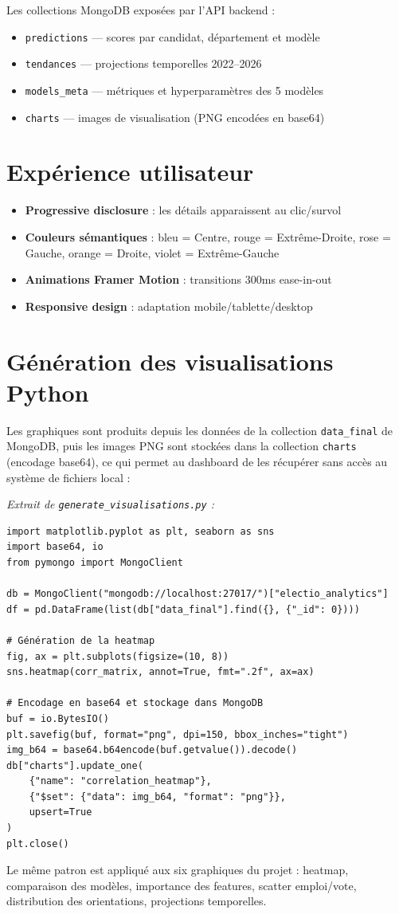 \medskip\noindent
Les collections MongoDB exposées par l'API backend :
\begin{itemize}
  \item \texttt{predictions} --- scores par candidat, département et modèle
  \item \texttt{tendances} --- projections temporelles 2022--2026
  \item \texttt{models\_meta} --- métriques et hyperparamètres des 5 modèles
  \item \texttt{charts} --- images de visualisation (PNG encodées en base64)
\end{itemize}

\section{Expérience utilisateur}

\begin{itemize}
  \item \textbf{Progressive disclosure} : les détails apparaissent au clic/survol
  \item \textbf{Couleurs sémantiques} : bleu = Centre, rouge = Extrême-Droite,
    rose = Gauche, orange = Droite, violet = Extrême-Gauche
  \item \textbf{Animations Framer Motion} : transitions 300ms ease-in-out
  \item \textbf{Responsive design} : adaptation mobile/tablette/desktop
\end{itemize}

\section{Génération des visualisations Python}

Les graphiques sont produits depuis les données de la collection \texttt{data\_final}
de MongoDB, puis les images PNG sont stockées dans la collection \texttt{charts}
(encodage base64), ce qui permet au dashboard de les récupérer sans accès
au système de fichiers local :

\medskip\noindent\textit{Extrait de \texttt{generate\_visualisations.py} :}
\begin{verbatim}
import matplotlib.pyplot as plt, seaborn as sns
import base64, io
from pymongo import MongoClient

db = MongoClient("mongodb://localhost:27017/")["electio_analytics"]
df = pd.DataFrame(list(db["data_final"].find({}, {"_id": 0})))

# Génération de la heatmap
fig, ax = plt.subplots(figsize=(10, 8))
sns.heatmap(corr_matrix, annot=True, fmt=".2f", ax=ax)

# Encodage en base64 et stockage dans MongoDB
buf = io.BytesIO()
plt.savefig(buf, format="png", dpi=150, bbox_inches="tight")
img_b64 = base64.b64encode(buf.getvalue()).decode()
db["charts"].update_one(
    {"name": "correlation_heatmap"},
    {"$set": {"data": img_b64, "format": "png"}},
    upsert=True
)
plt.close()
\end{verbatim}

\noindent Le même patron est appliqué aux six graphiques du projet :
heatmap, comparaison des modèles, importance des features, scatter emploi/vote,
distribution des orientations, projections temporelles.
